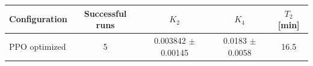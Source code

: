 \begin{tabular}{lcccc}
\toprule
Configuration & Successful runs & $K_2$ & $K_4$ & $T_2$ [min] \\
\midrule
PPO optimized & 5 & 0.003842 $\pm$ 0.00145 & 0.0183 $\pm$ 0.0058 & 16.5 \\
\bottomrule
\end{tabular}
